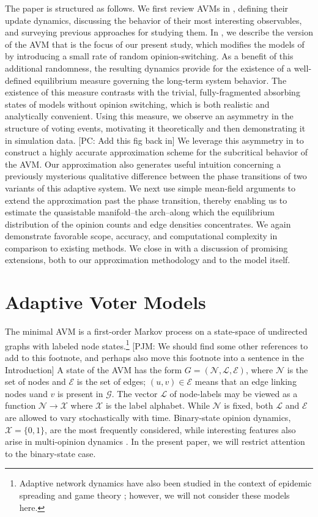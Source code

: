 \documentclass[review, onefignum, onetabnum]{siamart171218}
\newcommand{\pjm}[1]{{\color{blue}[PJM: #1]}}
\newcommand{\pc}[1]{{\color{comment_purple}[PC: #1]}}
\begin{document}
	The paper is structured as follows. 
	We first review AVMs in , defining their update dynamics, discussing the behavior of their most interesting observables, and surveying previous approaches for studying them. 
	In , we describe the version of the AVM that is the focus of our present study, which modifies the models of \cite{Durrett2012} by introducing a small rate of random opinion-switching. 
	As a benefit of this additional randomness, the resulting dynamics provide for the existence of a well-defined equilibrium measure governing the long-term system behavior. 
	The existence of this measure contrasts with the trivial, fully-fragmented absorbing states of models without opinion switching, which is both realistic and analytically convenient. 
	Using this measure, we observe an asymmetry in the structure of voting events, motivating it theoretically and then demonstrating it in simulation data. \pc{Add this fig back in} 
	We leverage this asymmetry in  to construct a highly accurate approximation scheme for the subcritical behavior of the AVM. 
	Our approximation also generates useful intuition concerning a previously mysterious qualitative difference between the phase transitions of two variants of this adaptive system.
	We next use simple mean-field arguments to extend the approximation past the phase transition, thereby enabling us to estimate the quasistable manifold--the arch--along which the equilibrium distribution of the opinion counts and edge densities concentrates.
	We again demonstrate favorable scope, accuracy, and computational complexity in comparison to existing methods.
	We close in  with a discussion of promising extensions, both to our approximation methodology and to the model itself. 
	
\section{Adaptive Voter Models} \label{sec:AVMs}

	The minimal AVM is a first-order Markov process on a state-space of undirected graphs with labeled node states.\footnote{Adaptive network dynamics have also been studied in the context of epidemic spreading \cite{Marceau2010,Lee2017} and game theory \cite{Malik2016}; however, we will not consider these models here.} \pjm{We should find some other references to add to this footnote, and perhaps also move this footnote into a sentence in the Introduction} 
	A state of the AVM has the form $G = (\mathcal{N}, \mathcal{L}, \mathcal{E})$, where $\mathcal{N}$ is the set of nodes and $\mathcal{E}$ is the set of edges; $(u,v) \in \mathcal{E}$ means that an edge linking nodes $u$and $v$ is present in $\mathcal{G}$.
    The vector $\mathcal{L}$  of node-labels may be viewed as a function $\mathcal{N} \rightarrow \mathcal{X}$ where $\mathcal{X}$ is the label alphabet.  
	While $\mathcal{N}$ is fixed, both $\mathcal{L}$ and $\mathcal{E}$ are allowed to vary stochastically with time. 
	Binary-state opinion dynamics, $\mathcal{X} = \{0,1\}$, are the most frequently considered, while interesting features also arise in multi-opinion dynamics \cite{Holme2006, Shi2013}. 
	In the present paper, we will restrict attention to the binary-state case.
	
\end{document}
